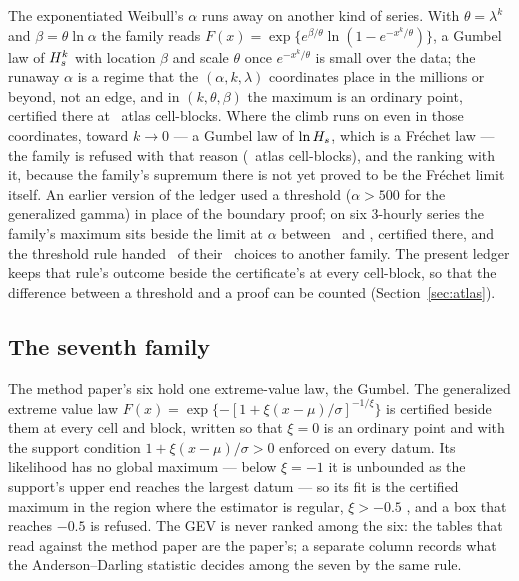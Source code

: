 \documentclass[preprint,11pt,authoryear]{elsarticle}
\begin{document}
The exponentiated Weibull's $\alpha$ runs away on another kind of series. With $\theta = \lambda^k$ and $\beta = \theta \ln\alpha$ the family reads $F(x) = \exp\{e^{\beta/\theta}\ln(1 - e^{-x^k/\theta})\}$, a Gumbel law of $H_s^k$ with location $\beta$ and scale $\theta$ once $e^{-x^k/\theta}$ is small over the data; the runaway $\alpha$ is a regime that the $(\alpha, k, \lambda)$ coordinates place in the millions or beyond, not an edge, and in $(k, \theta, \beta)$ the maximum is an ordinary point, certified there at \AEwG\ atlas cell-blocks. Where the climb runs on even in those coordinates, toward $k \to 0$ --- a Gumbel law of $\ln H_s$, which is a Fr\'echet law --- the family is refused with that reason (\AEwStop\ atlas cell-blocks), and the ranking with it, because the family's supremum there is not yet proved to be the Fr\'echet limit itself. An earlier version of the ledger used a threshold ($\alpha > 500$ for the generalized gamma) in place of the boundary proof; on six 3-hourly series the family's maximum sits beside the limit at $\alpha$ between \RNearAlphaLo\ and \RNearAlphaHi, certified there, and the threshold rule handed \RNearMoves\ of their \RNearChoices\ choices to another family. The present ledger keeps that rule's outcome beside the certificate's at every cell-block, so that the difference between a threshold and a proof can be counted (Section~\ref{sec:atlas}).

\subsection{The seventh family}\label{sec:gev}
The method paper's six hold one extreme-value law, the Gumbel. The generalized extreme value law $F(x) = \exp\{-[1 + \xi(x-\mu)/\sigma]^{-1/\xi}\}$ is certified beside them at every cell and block, written so that $\xi = 0$ is an ordinary point and with the support condition $1 + \xi(x-\mu)/\sigma > 0$ enforced on every datum. Its likelihood has no global maximum --- below $\xi = -1$ it is unbounded as the support's upper end reaches the largest datum --- so its fit is the certified maximum in the region where the estimator is regular, $\xi > -0.5$ \citep{smith1985}, and a box that reaches $-0.5$ is refused. The GEV is never ranked among the six: the tables that read against the method paper are the paper's; a separate column records what the Anderson--Darling statistic decides among the seven by the same rule.
\end{document}
